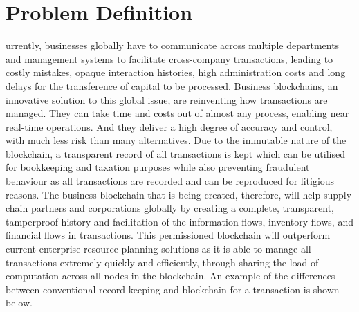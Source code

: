 \let\textcircled=\pgftextcircled
\chapter{Problem Definition}
\label{chap:intro}

urrently, businesses globally have to communicate across multiple departments and management systems to facilitate cross-company transactions, leading to costly mistakes, opaque interaction histories, high administration costs and long delays for the transference of capital to be processed. Business blockchains, an innovative solution to this global issue, are reinventing how transactions are managed. They can take time and costs out of almost any process, enabling near real-time operations. And they deliver a high degree of accuracy and control, with much less risk than many alternatives. Due to the immutable nature of the blockchain, a transparent record of all transactions is kept which can be utilised for bookkeeping and taxation purposes while also preventing fraudulent behaviour as all transactions are recorded and can be reproduced for litigious reasons. The business blockchain that is being created, therefore, will help supply chain partners and corporations globally by creating a complete, transparent, tamperproof history and facilitation of the information flows, inventory flows, and financial flows in transactions. This permissioned blockchain will outperform current enterprise resource planning solutions as it is able to manage all transactions extremely quickly and efficiently, through sharing the load of computation across all nodes in the blockchain. An example of the differences between conventional record keeping and blockchain for a transaction is shown below. \\

